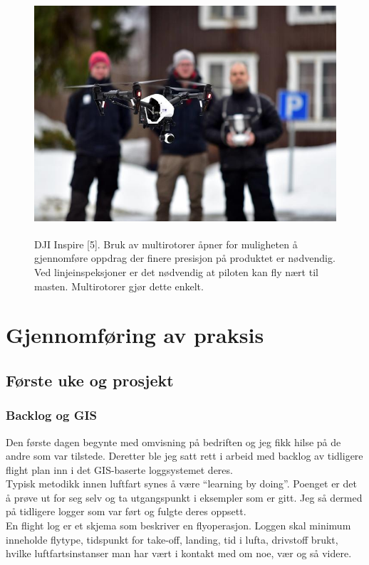 \documentclass[12pt, a4paper]{article}
\begin{document}
\begin{figure}[ht]
	\centering
	\includegraphics[width = .6\textwidth, height = 9cm]{bilder/Dji_inspire.jpg}
	\caption[DJI Inspire]{DJI Inspire [5]. Bruk av multirotorer åpner for muligheten å gjennomføre oppdrag der finere presisjon på produktet er nødvendig. Ved linjeinspeksjoner er det nødvendig at piloten kan fly nært til masten. Multirotorer gjør dette enkelt.}
\end{figure}


\clearpage
\section{Gjennomføring av praksis}
\subsection{Første uke og prosjekt}
\subsubsection{Backlog og GIS}

Den første dagen begynte med omvisning på bedriften og jeg fikk hilse på de andre som var tilstede. Deretter ble jeg satt rett i arbeid med backlog av tidligere flight plan inn i det GIS-baserte loggsystemet deres. \\
Typisk metodikk innen luftfart synes å være ``learning by doing''. Poenget er det å prøve ut for seg selv og ta utgangspunkt i eksempler som er gitt. Jeg så dermed på tidligere logger som var ført og fulgte deres oppsett.\\
En flight log er et skjema som beskriver en flyoperasjon. Loggen skal minimum inneholde flytype, tidspunkt for take-off, landing, tid i lufta, drivstoff brukt, hvilke luftfartsinstanser man har vært i kontakt med om noe, vær og så videre. 
\end{document}
